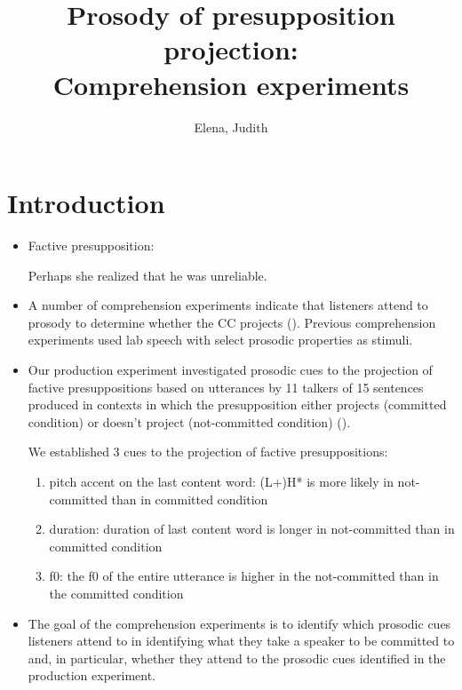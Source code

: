 \documentclass[dina4,12pt,fleqn]{article}
\title{Prosody of presupposition projection: \\ Comprehension experiments}
\author{Elena, Judith}
\newcommand{\6}{\mbox{$[\hspace*{-.6mm}[$}}
\newcommand{\9}{\mbox{$]\hspace*{-.6mm}]$}}
\begin{document}
\maketitle

\section{Introduction}

\begin{itemize}[leftmargin=12pt]

\item Factive presupposition:

\begin{exe}
\ex\label{ex} Perhaps she realized that he was unreliable.
\end{exe}

\item A number of comprehension experiments indicate that listeners attend to prosody to determine whether the CC projects (\citealt*{cummins-rohde-2015, tonhauser-2016}). Previous comprehension experiments used lab speech with select prosodic
properties as stimuli.

\item Our production experiment investigated prosodic cues to the projection of factive presuppositions based on utterances by 11 talkers of 15 sentences produced in contexts in which the presupposition either projects (committed condition) or doesn't project (not-committed condition) (\citealt*{vaiksnoraite-etal-2018}).

We established 3 cues to the projection of factive presuppositions:

\begin{enumerate}[noitemsep]

    \item  pitch accent on the last content word:  (L+)H* is more likely in not-committed than in committed condition
    
    \item duration: duration of last content word is longer in not-committed than in committed condition
    
    \item f0: the f0 of the entire utterance is higher in the not-committed than in the committed condition
    
\end{enumerate}

\item The goal of the comprehension experiments is to identify which prosodic cues listeners attend to in identifying what they take a speaker to be committed to and, in particular, whether they attend to the prosodic cues identified in the production experiment.


\end{itemize}
\end{document}
